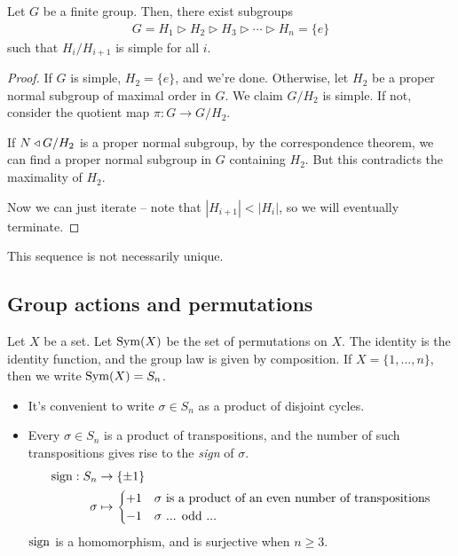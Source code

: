 \documentclass{../template/note}
\begin{document}
    \begin{theorem}
        Let $G$ be a finite group. Then, there exist subgroups
        \begin{align*}
            G = H_1 \triangleright H_2 \triangleright H_3 \triangleright \cdots \triangleright H_n = \{e\}
        \end{align*}
        such that $H_i/H_{i+1}$ is simple for all $i$.        
    \end{theorem}
    
    \begin{proof}
        If $G$ is simple, $H_2 = \{e\}$, and we're done. Otherwise, let $H_2$ be a proper normal subgroup of maximal order in $G$. We claim $G/H_2$ is simple. If not, consider the quotient map $\pi: G \to G/H_2$.

        If $N \triangleleft G/H_2$ is a proper normal subgroup, by the correspondence theorem, we can find a proper normal subgroup in $G$ containing $H_2$. But this contradicts the maximality of $H_2$.

        Now we can just iterate -- note that $|H_{i+1}| < |H_i|$, so we will eventually terminate.
    \end{proof}
    
    \begin{remark*}
        This sequence is not necessarily unique.
    \end{remark*}
    
    \subsection{Group actions and permutations}

    \begin{definition}
        Let $X$ be a set. Let $\operatorname{Sym}(X)$ be the set of permutations on $X$. The identity is the identity function, and the group law is given by composition. If $X = \{1, \dots, n\}$, then we write $\operatorname{Sym}(X) = S_n$.
    \end{definition}
    
    \begin{itemize}
        \item It's convenient to write $\sigma \in S_n$ as a product of disjoint cycles.
        \item Every $\sigma \in S_n$ is a product of transpositions, and the number of such transpositions gives rise to the \emph{sign} of $\sigma$.
        \begin{align*}
            \operatorname{sign}: S_n &\to \{\pm 1\} \\
            \sigma &\mapsto \begin{cases}
                +1 & \sigma \text{ is a product of an even number of transpositions} \\
                -1 & \sigma \text{ ... odd ...}
            \end{cases}
        \end{align*}
        $\operatorname{sign}$ is a homomorphism, and is surjective when $n \geq 3$.
        
    \end{itemize}
    
\end{document}
